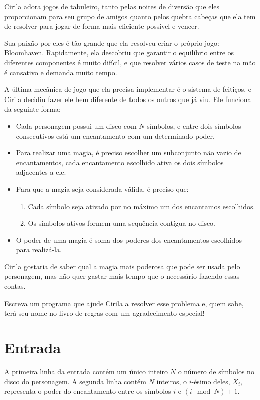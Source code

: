 Cirila adora jogos de tabuleiro, tanto pelas noites de diversão que eles proporcionam para seu grupo de amigos quanto pelos quebra cabeças que ela tem de resolver para jogar de forma mais eficiente possível e vencer.

Sua paixão por eles é tão grande que ela resolveu criar o próprio jogo: Bloomhaven. Rapidamente, ela descobriu que garantir o equilíbrio entre os diferentes componentes é muito difícil, e que resolver vários casos de teste na mão é cansativo e demanda muito tempo.

A última mecânica de jogo que ela precisa implementar é o sistema de feitiços, e Cirila decidiu fazer ele bem diferente de todos os outros que já viu.
Ele funciona da seguinte forma:

\begin{itemize}
   \item Cada personagem possui um disco com $N$ símbolos, e entre dois símbolos consecutivos está um encantamento com um determinado poder.
   \item Para realizar uma magia, é preciso escolher um subconjunto não vazio de encantamentos, cada encantamento escolhido ativa os dois símbolos adjacentes a ele.
   \item Para que a magia seja considerada válida, é preciso que: \begin{enumerate}
      \item Cada símbolo seja ativado por no máximo um dos encantamos escolhidos.
      \item Os símbolos ativos formem uma sequência contígua no disco.
    \end{enumerate}
    \item O poder de uma magia é soma dos poderes dos encantamentos escolhidos para realizá-la.
 \end{itemize}



Cirila gostaria de saber qual a magia mais poderosa que pode ser usada pelo personagem, mas não quer gastar mais tempo que o necessário fazendo essas contas.

Escreva um programa que ajude Cirila a resolver esse problema e, quem sabe, terá seu nome no livro de regras com um agradecimento especial!

\section*{Entrada}

A primeira linha da entrada contém um único inteiro $N$ o número de símbolos no disco do personagem.
A segunda linha contém $N$ inteiros, o $i$-ésimo deles, $X_i$, representa o poder do encantamento entre os símbolos $i$ e $(i \mod N) + 1$.


